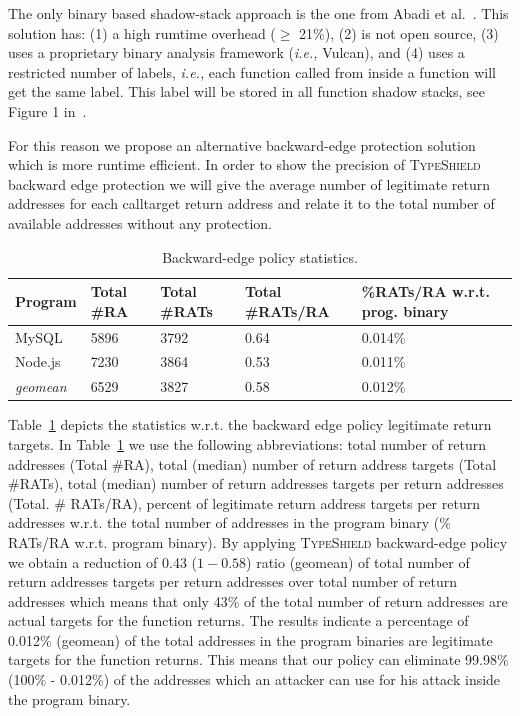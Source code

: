 The only binary
based shadow-stack approach is the one from Abadi et al.~\cite{abadi:cfi2}. This solution has:
(1) a high rumtime overhead ($\ge$ 21\%), 
(2) is not open source, 
(3) uses a proprietary binary analysis framework (\textit{i.e.,} Vulcan), and
(4) uses a restricted number of labels, \textit{i.e.,} each function called from inside a function will get the same label. This label will be 
stored in all function shadow stacks, see Figure 1 in~\cite{abadi:cfi2}. 

For this reason we propose an alternative backward-edge protection solution which is more runtime efficient.
In order to show the precision of \textsc{TypeShield} backward edge protection we will give the average number of legitimate return addresses for each calltarget return address 
and relate it to the total number of available addresses without any protection.

\begin{table}[H]
\centering 
 \begin{tabular}{ l | p{.7cm}  | p{.9cm}  | p{1.0cm}  | p{1.8cm} } 
  \textbf{Program}  & Total \#RA    & Total \#RATs  & Total \#RATs/RA  & \%RATs/RA w.r.t. prog. binary \\\hline 
  MySQL             & 5896          & 3792          & 0.64             & 0.014\%                       \\
  Node.js           & 7230          & 3864          & 0.53             & 0.011\%                       \\
  \textit{geomean}  & 6529          & 3827          & 0.58             & 0.012\%                       \\\hline
\end{tabular}
\caption{Backward-edge policy statistics.}
\label{Backward-edge policy statistics.}
\vspace{-.5cm}
\end{table}

Table~\ref{Backward-edge policy statistics.} depicts the statistics w.r.t. the backward edge policy legitimate return targets.
In Table~\ref{Backward-edge policy statistics.} we use the following abbreviations:
total number of return addresses (Total \#RA),
total (median) number of return address targets (Total \#RATs),
total (median) number of return addresses targets per return addresses (Total. \# RATs/RA),
percent of legitimate return address targets per return addresses w.r.t. the total number of addresses in the program binary (\% RATs/RA w.r.t. program binary).
By applying \textsc{TypeShield} backward-edge policy we obtain a reduction of 0.43 ($1-0.58$) ratio (geomean)
of total number of return addresses targets per return addresses over total number of return addresses which means that only 43\% of the total number of return addresses are actual targets
for the function returns. The results indicate a percentage of 0.012\% (geomean) of the total addresses in the program binaries are legitimate targets for the function returns. This means
that our policy can eliminate 99.98\% (100\% - 0.012\%) of the addresses which an attacker can use for his attack inside the program binary.



